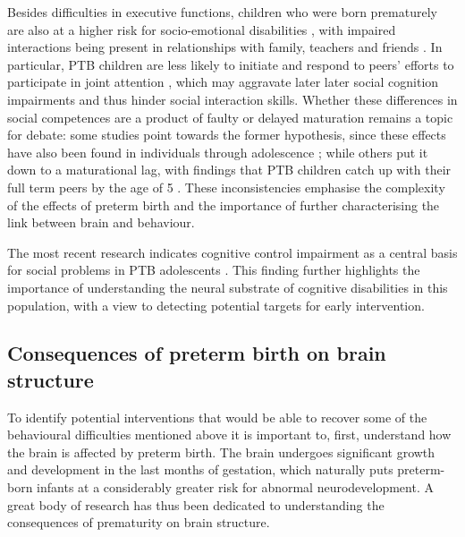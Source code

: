 Besides difficulties in executive functions, children who were born prematurely are also at a higher risk for socio-emotional disabilities \citep{Zmyj2017}, with impaired interactions being present in relationships with family, teachers and friends \citep{Twilhaar2019}. In particular, PTB children are less likely to initiate and respond to peers' efforts to participate in joint attention \citep{Zmyj2017}, which may aggravate later later social cognition impairments and thus hinder social interaction skills. Whether these differences in social competences are a product of faulty or delayed maturation remains a topic for debate: some studies point towards the former hypothesis, since these effects have also been found in individuals through adolescence  \citep{Healy2013, Saigal2016}; while others put it down to a maturational lag, with findings that PTB children catch up with their full term peers by the age of 5 \citep{Witt2018}. These inconsistencies emphasise the complexity of the effects of preterm birth and the importance of further characterising the link between brain and behaviour.

The most recent research indicates cognitive control impairment as a central basis for social problems in PTB adolescents \citep{Twilhaar2019}. This finding further highlights the importance of understanding the neural substrate of cognitive disabilities in this population, with a view to detecting potential targets for early intervention. 


\subsection{Consequences of preterm birth on brain structure}

To identify potential interventions that would be able to recover some of the behavioural difficulties mentioned above it is important to, first, understand how the brain is affected by preterm birth. The brain undergoes significant growth and development in the last months of gestation, which naturally puts preterm-born infants at a considerably greater risk for abnormal neurodevelopment. A great body of research has thus been dedicated to understanding the consequences of prematurity on brain structure.

